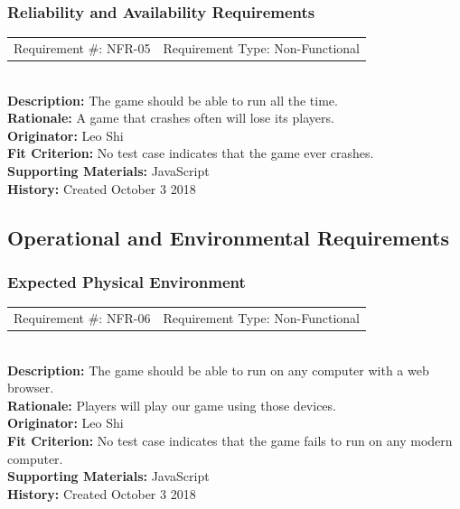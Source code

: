 \documentclass[12pt, titlepage]{article}
\begin{document}
\subsubsection{Reliability and Availability Requirements}
\begin{reqbox}
	\begin{tabular}{cc}
		Requirement \#: NFR-05 & Requirement Type: Non-Functional \\
	\end{tabular} \\
	\textbf{Description:} The game should be able to run all the time. \\
	\textbf{Rationale:} A game that crashes often will lose its players.\\
	\textbf{Originator:} Leo Shi\\
	\textbf{Fit Criterion:} No test case indicates that the game ever crashes.\\
	\textbf{Supporting Materials:} JavaScript \\
	\textbf{History:} Created October 3 2018
\end{reqbox}

\subsection{Operational and Environmental Requirements}

\subsubsection{Expected Physical Environment}
\begin{reqbox}
	\begin{tabular}{cc}
		Requirement \#: NFR-06 & Requirement Type: Non-Functional \\
	\end{tabular} \\
	\textbf{Description:} The game should be able to run on any computer with a web browser.\\
	\textbf{Rationale:} Players will play our game using those devices.\\
	\textbf{Originator:} Leo Shi\\
	\textbf{Fit Criterion:} No test case indicates that the game fails to run on any modern computer.\\
	\textbf{Supporting Materials:} JavaScript \\
	\textbf{History:} Created October 3 2018
\end{reqbox}
\end{document}
